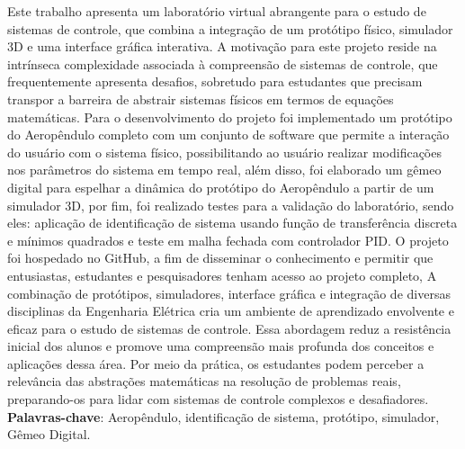
\begin{resumo}
Este trabalho apresenta um laboratório virtual abrangente para o estudo de sistemas de controle, que combina a integração de um protótipo físico, simulador 3D e uma interface gráfica interativa. A motivação para este projeto reside na intrínseca complexidade associada à compreensão de sistemas de controle, que frequentemente apresenta desafios, sobretudo para estudantes que precisam transpor a barreira de abstrair sistemas físicos em termos de equações matemáticas. Para o desenvolvimento do projeto foi implementado um protótipo do Aeropêndulo completo com um conjunto de software que permite a interação do usuário com o sistema físico, possibilitando ao usuário realizar modificações nos parâmetros do sistema em tempo real, além disso, foi elaborado um gêmeo digital para espelhar a dinâmica do protótipo do Aeropêndulo a partir de um simulador 3D, por fim, foi realizado testes para a validação do laboratório, sendo eles: aplicação de identificação de sistema usando função de transferência discreta e mínimos quadrados e teste em malha fechada com controlador PID. O projeto foi hospedado no GitHub, a fim de disseminar o conhecimento e permitir que entusiastas, estudantes e pesquisadores tenham acesso ao projeto completo, A combinação de protótipos, simuladores, interface gráfica e integração de diversas disciplinas da Engenharia Elétrica cria um ambiente de aprendizado envolvente e eficaz para o estudo de sistemas de controle. Essa abordagem reduz a resistência inicial dos alunos e promove uma compreensão mais profunda dos conceitos e aplicações dessa área. Por meio da prática, os estudantes podem perceber a relevância das abstrações matemáticas na resolução de problemas reais, preparando-os para lidar com sistemas de controle complexos e desafiadores.\\

\textbf{Palavras-chave}: Aeropêndulo, identificação de sistema, protótipo, simulador, Gêmeo Digital.
\end{resumo}



